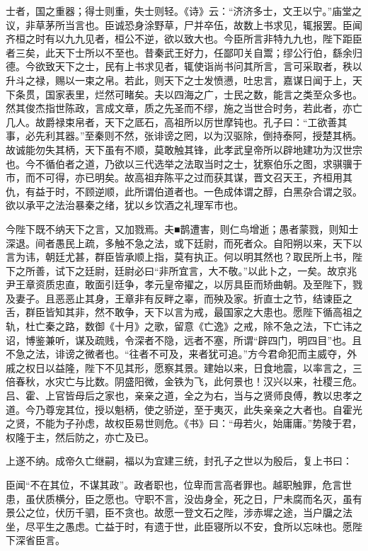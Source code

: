 \documentclass[]{article}
\begin{document}
士者，国之重器；得士则重，失士则轻。《诗》云：``济济多士，文王以宁。''庙堂之议，非草茅所当言也。臣诚恐身涂野草，尸并卒伍，故数上书求见，辄报罢。臣闻齐桓之时有以九九见者，桓公不逆，欲以致大也。今臣所言非特九九也，陛下距臣者三矣，此天下士所以不至也。昔秦武王好力，任鄙叩关自鬻；缪公行伯，繇余归德。今欲致天下之士，民有上书求见者，辄使诣尚书问其所言，言可采取者，秩以升斗之禄，赐以一束之帛。若此，则天下之士发愤懑，吐忠言，嘉谋日闻于上，天下条贯，国家表里，烂然可睹矣。夫以四海之广，士民之数，能言之类至众多也。然其俊杰指世陈政，言成文章，质之先圣而不缪，施之当世合时务，若此者，亦亡几人。故爵禄束帛者，天下之厎石，高祖所以厉世摩钝也。孔子曰：``工欲善其事，必先利其器。''至秦则不然，张诽谤之罔，以为汉驱除，倒持泰阿，授楚其柄。故诚能勿失其柄，天下虽有不顺，莫敢触其锋，此孝武皇帝所以辟地建功为汉世宗也。今不循伯者之道，乃欲以三代选举之法取当时之士，犹察伯乐之图，求骐骥于市，而不可得，亦已明矣。故高祖弃陈平之过而获其谋，晋文召天王，齐桓用其仇，有益于时，不顾逆顺，此所谓伯道者也。一色成体谓之醇，白黑杂合谓之驳。欲以承平之法治暴秦之绪，犹以乡饮酒之礼理军市也。

今陛下既不纳天下之言，又加戮焉。夫■鹊遭害，则仁鸟增逝；愚者蒙戮，则知士深退。间者愚民上疏，多触不急之法，或下廷尉，而死者众。自阳朔以来，天下以言为讳，朝廷尤甚，群臣皆承顺上指，莫有执正。何以明其然也？取民所上书，陛下之所善，试下之廷尉，廷尉必曰``非所宜言，大不敬。''以此卜之，一矣。故京兆尹王章资质忠直，敢面引廷争，孝元皇帝擢之，以厉具臣而矫曲朝。及至陛下，戮及妻子。且恶恶止其身，王章非有反畔之辜，而殃及家。折直士之节，结谏臣之舌，群臣皆知其非，然不敢争，天下以言为戒，最国家之大患也。愿陛下循高祖之轨，杜亡秦之路，数御《十月》之歌，留意《亡逸》之戒，除不急之法，下亡讳之诏，博鉴兼听，谋及疏贱，令深者不隐，远者不塞，所谓``辟四门，明四目''也。且不急之法，诽谤之微者也。``往者不可及，来者犹可追。''方今君命犯而主威夺，外戚之权日以益隆，陛下不见其形，愿察其景。建始以来，日食地震，以率言之，三倍春秋，水灾亡与比数。阴盛阳微，金铁为飞，此何景也！汉兴以来，社稷三危。吕、霍、上官皆母后之家也，亲亲之道，全之为右，当与之贤师良傅，教以忠孝之道。今乃尊宠其位，授以魁柄，使之骄逆，至于夷灭，此失亲亲之大者也。自霍光之贤，不能为子孙虑，故权臣易世则危。《书》曰：``毋若火，始庸庸。''势陵于君，权隆于主，然后防之，亦亡及已。

上遂不纳。成帝久亡继嗣，福以为宜建三统，封孔子之世以为殷后，复上书曰：

臣闻``不在其位，不谋其政''。政者职也，位卑而言高者罪也。越职触罪，危言世患，虽伏质横分，臣之愿也。守职不言，没齿身全，死之日，尸未腐而名灭，虽有景公之位，伏历千驷，臣不贪也。故愿一登文石之陛，涉赤墀之途，当户牖之法坐，尽平生之愚虑。亡益于时，有遗于世，此臣寝所以不安，食所以忘味也。愿陛下深省臣言。
\end{document}
